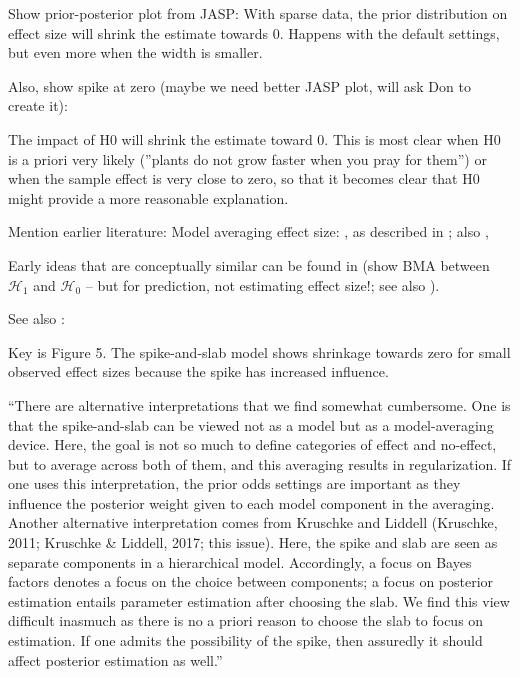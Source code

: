 \documentclass[a4paper]{article}
\begin{document}
	
	Show prior-posterior plot from JASP:
	With sparse data, the prior distribution on effect size will shrink the estimate towards 0. Happens with the default settings, but even more when the width is smaller.
	
	Also, show spike at zero (maybe we need better JASP plot, will ask Don to create it):
	
	The impact of H0 will shrink the estimate toward 0. This is most clear when H0 is a priori very likely (''plants do not grow faster when you pray for them'') or when the sample effect is very close to zero, so that it becomes clear that H0 might provide a more reasonable explanation.
	
	Mention earlier literature:
	Model averaging effect size:
	\cite[pp. 640-641]{ZellnerVandaele1975}, as described in \cite[p. 600-601]{ZellnerSiow1980}; also \cite[p. 57]{Haldane1932}, \cite{IversonEtAl2010}
	
	Early ideas that are conceptually similar can be found in \cite[p. 387]{WrinchJeffreys1921} (show BMA between $\mathcal{H}_1$ and $\mathcal{H}_0$ -- but for prediction, not estimating effect size!; see also \cite{Jevons18741913}).
	
	See also \cite{RouderEtAl2018PBR}:
	
	Key is Figure 5. The spike-and-slab model shows shrinkage towards zero for small observed effect sizes because the spike has increased influence.
	
	``There are alternative interpretations that we find somewhat cumbersome. One is that the spike-and-slab can be viewed not as a model but as a model-averaging device. Here, the goal is not so much to define categories of effect and no-effect, but to average across both of them, and this averaging results in regularization. If one uses this interpretation, the prior odds settings are important as they influence the posterior weight given to each model component in the averaging. Another alternative interpretation comes from Kruschke and Liddell (Kruschke, 2011; Kruschke \& Liddell, 2017; this issue). Here, the spike and slab are seen as separate components in a hierarchical model. Accordingly, a focus on Bayes factors denotes a focus on the choice between components; a focus on posterior estimation entails parameter estimation after choosing the slab. We find this view difficult inasmuch as there is no a priori reason to choose the slab to focus on estimation. If one admits the possibility of the spike, then assuredly it should affect posterior estimation as well.''
	
\end{document}
